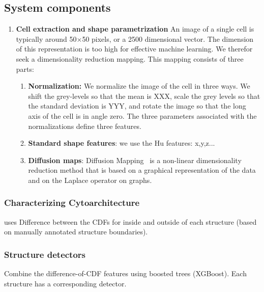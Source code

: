 \documentclass[runningheads]{llncs}
\begin{document}
\subsection{System components}

\begin{enumerate}
\item{\bf Cell extraction and shape parametrization}
An image of a single cell is typically around 50$\times$50 pixels, or a 2500 dimensional vector. The dimension of this representation is too high for effective machine learning. We therefor seek a dimensionality reduction mapping. This mapping consists of three parts:
\begin{enumerate}
    \item {\bf Normalization:} We normalize the image of the cell in three ways. We 
    shift the grey-levels so that the mean is XXX, scale the grey levels so that the standard deviation is YYY, and rotate the image so that the long axis of the cell is in angle zero. The three parameters associated with the normalizations define three features.
    \item {\bf Standard shape features}: we use the Hu features: x,y,z...
    \item{ \bf  Diffusion maps}: Diffusion Mapping~\cite{Belkin,
        Coifman} is a non-linear dimensionality reduction method that
      is based on a graphical representation of the data and on the
      Laplace operator on graphs.
      \end{enumerate}
\end{enumerate}
      \subsubsection{ Characterizing Cytoarchitecture} uses Difference between the CDFs for inside and outside of each structure (based on manually annotated structure boundaries). 
\subsubsection { Structure detectors} Combine the difference-of-CDF
features using boosted trees (XGBoost). Each structure has a
corresponding detector.
\end{document}
